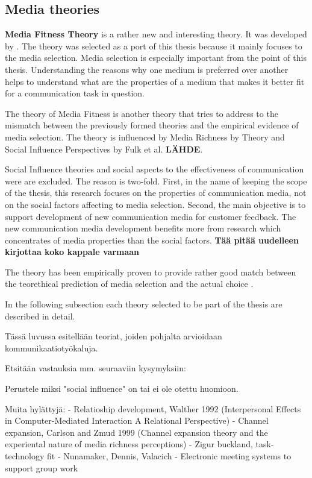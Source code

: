 \documentclass[english,12pt,a4paper,pdftex]{article}
\begin{document}
\subsection{Media theories}

\textbf{Media Fitness Theory} is a rather new and interesting theory. It was developed by \citet{higa2007}. The theory was selected as a port of this thesis because it mainly focuses to the media selection. Media selection is especially important from the point of this thesis. Understanding the reasons why one medium is preferred over another helps to understand what are the properties of a medium that makes it better fit for a communication task in question.

The theory of Media Fitness is another theory that tries to address to the mismatch between the previously formed theories and the empirical evidence of media selection. The theory is influenced by Media Richness by \citet{daft1986} Theory and Social Influence Perspectives by Fulk et al. \textbf{LÄHDE}.

Social Influence theories and social aspects to the effectiveness of communication were are excluded. The reason is two-fold. First, in the name of keeping the scope of the thesis, this research focuses on the properties of communication media, not on the social factors affecting to media selection. Second, the main objective is to support development of new communication media for customer feedback. The new communication media development benefits more from research which concentrates of media properties than the social factors. \textbf{Tää pitää uudelleen kirjottaa koko kappale varmaan}

The theory has been empirically proven to provide rather good match between the teorethical prediction of media selection and the actual choice \citep{higa2007} \citep{gu2011}.

In the following subsection each theory selected to be part of the thesis are described in detail.

Tässä luvussa esitellään teoriat, joiden pohjalta arvioidaan kommunikaatiotyökaluja.

Etsitään vastauksia mm. seuraaviin kysymyksiin:

Perustele miksi "social influence" on tai ei ole otettu huomioon.

Muita hylättyjä: 
- Relatioship development, Walther 1992 (Interpersonal Effects in Computer-Mediated Interaction A Relational Perspective)
- Channel expansion, Carlson and Zmud 1999 (Channel expansion theory and the experiental nature of media richness perceptions)
- Zigur buckland, task-technology fit
- Nunamaker, Dennis, Valacich - Electronic meeting systems to support group work
\end{document}
